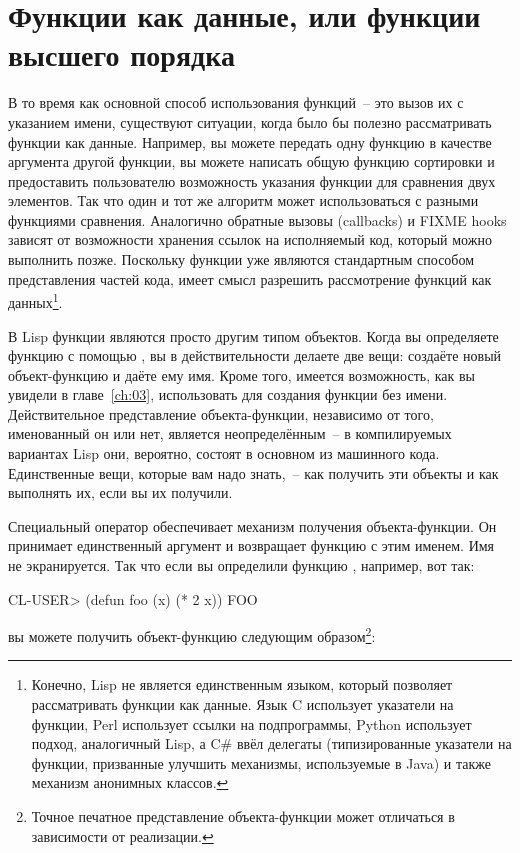 \section{Функции как данные, или функции высшего порядка}

В то время как основной способ использования функций~-- это вызов их с указанием имени,
существуют ситуации, когда было бы полезно рассматривать функции как данные.  Например, вы
можете передать одну функцию в качестве аргумента другой функции, вы можете написать общую
функцию сортировки и предоставить пользователю возможность указания функции для сравнения
двух элементов.  Так что один и тот же алгоритм может использоваться с разными функциями
сравнения.  Аналогично обратные вызовы (callbacks) и FIXME hooks зависят от возможности
хранения ссылок на исполняемый код, который можно выполнить позже.  Поскольку функции уже
являются стандартным способом представления частей кода, имеет смысл разрешить
рассмотрение функций как данных\footnote{Конечно, Lisp не является единственным языком,
  который позволяет рассматривать функции как данные.  Язык C использует указатели на
  функции, Perl использует ссылки на подпрограммы, Python использует подход, аналогичный
  Lisp, а C\# ввёл делегаты (типизированные указатели на функции, призванные улучшить
  механизмы, используемые в Java) и также механизм анонимных классов.}.

В Lisp функции являются просто другим типом объектов.  Когда вы определяете функцию с
помощью , вы в действительности делаете две вещи: создаёте новый
объект-функцию и даёте ему имя.  Кроме того, имеется возможность, как вы
увидели в главе~\ref{ch:03}, использовать  для создания функции без
имени.  Действительное
представление объекта-функции, независимо от того, именованный он или нет, является
неопределённым~-- в компилируемых вариантах Lisp они, вероятно, состоят в основном из
машинного кода.  Единственные вещи, которые вам надо знать,~-- как получить эти объекты
и как выполнять их, если вы их получили.

Специальный оператор  обеспечивает механизм получения объекта-функции.  Он
принимает единственный аргумент и возвращает функцию с этим именем.  Имя не экранируется.
Так что если вы определили функцию , например, вот так:

\begin{myverb}
  CL-USER> (defun foo (x) (* 2 x))
  FOO
\end{myverb}

\noindent{}вы можете получить объект-функцию следующим образом\footnote{Точное печатное
  представление объекта-функции может отличаться в зависимости от реализации.}:


